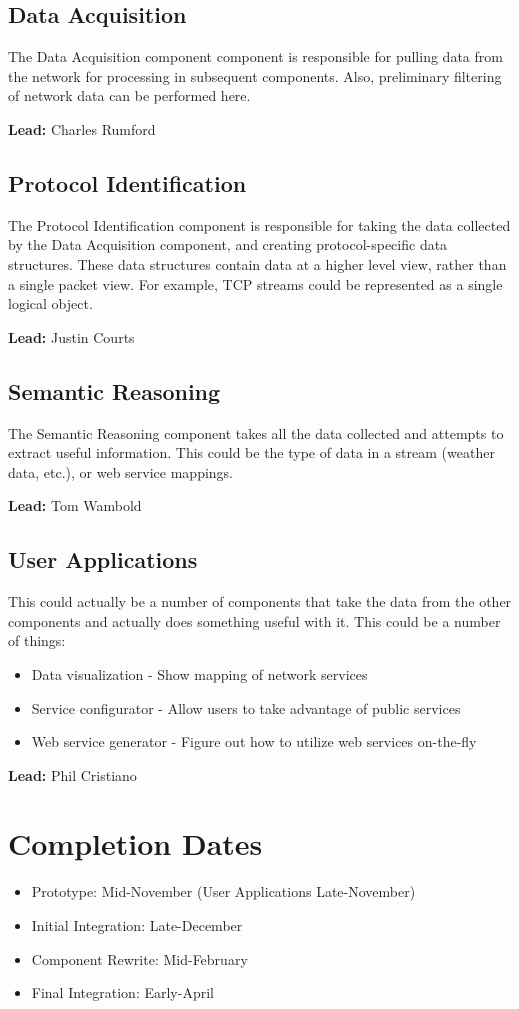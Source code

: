 \documentclass{article}
\begin{document}
\subsection{Data Acquisition}

The Data Acquisition component component is responsible for pulling data from
the network for processing in subsequent components.  Also, preliminary
filtering of network data can be performed here.

\noindent\textbf{Lead:} Charles Rumford

\subsection{Protocol Identification}

The Protocol Identification component is responsible for taking the data
collected by the Data Acquisition component, and creating protocol-specific
data structures.  These data structures contain data at a higher level view,
rather than a single packet view.  For example, TCP streams could be
represented as a single logical object.

\noindent\textbf{Lead:} Justin Courts

\subsection{Semantic Reasoning}

The Semantic Reasoning component takes all the data collected and attempts to
extract useful information.  This could be the type of data in a stream
(weather data, etc.), or web service mappings.

\noindent\textbf{Lead:} Tom Wambold

\subsection{User Applications}

This could actually be a number of components that take the data from the other
components and actually does something useful with it.  This could be a number
of things:

\begin{itemize}
    \item Data visualization - Show mapping of network services
    \item Service configurator - Allow users to take advantage of public
        services
    \item Web service generator - Figure out how to utilize web services
        on-the-fly
\end{itemize}

\noindent\textbf{Lead:} Phil Cristiano

\section{Completion Dates}

\begin{itemize}
    \item Prototype: Mid-November (User Applications Late-November)
    \item Initial Integration: Late-December
    \item Component Rewrite: Mid-February
    \item Final Integration: Early-April
\end{itemize}
\end{document}
